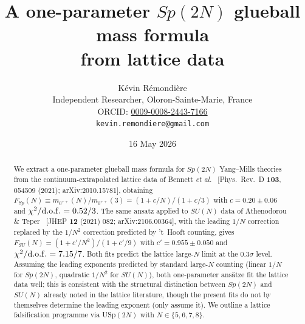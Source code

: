 \documentclass[aps,prd,reprint,nofootinbib,superscriptaddress,floatfix]{revtex4-2}
\begin{document}
\title{A one-parameter $Sp(2N)$ glueball mass formula\\ from lattice data}

\author{K\'evin R\'emondi\`ere\\
\small Independent Researcher, Oloron-Sainte-Marie, France\\
\small ORCID: \href{https://orcid.org/0009-0008-2443-7166}{0009-0008-2443-7166}\\
\small \texttt{kevin.remondiere@gmail.com}}
\date{16 May 2026}

\begin{abstract}
We extract a one-parameter glueball mass formula for $Sp(2N)$ Yang--Mills
theories from the continuum-extrapolated lattice data of Bennett \emph{et al.}~%
[Phys.\ Rev.\ D \textbf{103}, 054509 (2021); arXiv:2010.15781], obtaining
$F_{Sp}(N) \equiv m_{0^{++}}(N)/m_{0^{++}}(3) = (1+c/N)/(1+c/3)$ with
$c = 0.20 \pm 0.06$ and $\chi^2/{\rm d.o.f.} = 0.52/3$.
The same ansatz applied to $SU(N)$ data of Athenodorou \& Teper~%
[JHEP \textbf{12} (2021) 082; arXiv:2106.00364], with the leading $1/N$ correction
replaced by the $1/N^2$ correction predicted by 't~Hooft counting, gives
$F_{SU}(N) = (1+c'/N^2)/(1+c'/9)$ with $c' = 0.955 \pm 0.050$ and
$\chi^2/{\rm d.o.f.} = 7.15/7$.
Both fits predict the lattice large-$N$ limit at the $0.3\sigma$ level.
Assuming the leading exponents predicted by standard large-$N$ counting
(linear $1/N$ for $Sp(2N)$, quadratic $1/N^2$ for $SU(N)$), both
one-parameter ans\"atze fit the lattice data well; this is consistent with
the structural distinction between $Sp(2N)$ and $SU(N)$ already noted in
the lattice literature, though the present fits do not by themselves
determine the leading exponent (only assume it). We outline a lattice falsification programme via
USp$(2N)$ with $N \in \{5,6,7,8\}$.
\end{abstract}

\maketitle

\end{document}
